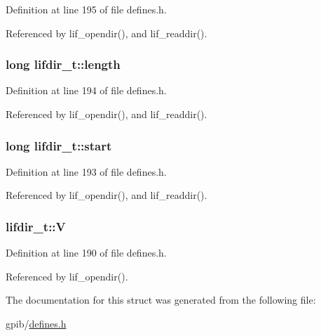 Definition at line 195 of file defines.\+h.



Referenced by lif\+\_\+opendir(), and lif\+\_\+readdir().

\subsubsection[{\texorpdfstring{length}{length}}]{\setlength{\rightskip}{0pt plus 5cm}long lifdir\+\_\+t\+::length}\hypertarget{structlifdir__t_a6645831320dcb5d1383a8796ae49a3e8}{}\label{structlifdir__t_a6645831320dcb5d1383a8796ae49a3e8}


Definition at line 194 of file defines.\+h.



Referenced by lif\+\_\+opendir(), and lif\+\_\+readdir().

\subsubsection[{\texorpdfstring{start}{start}}]{\setlength{\rightskip}{0pt plus 5cm}long lifdir\+\_\+t\+::start}\hypertarget{structlifdir__t_a4f82d919dbc56557a5dcb3e3d9e016c6}{}\label{structlifdir__t_a4f82d919dbc56557a5dcb3e3d9e016c6}


Definition at line 193 of file defines.\+h.



Referenced by lif\+\_\+opendir(), and lif\+\_\+readdir().

\subsubsection[{\texorpdfstring{V}{V}}]{ lifdir\+\_\+t\+::V}\hypertarget{structlifdir__t_a5a888dc3f1844ff0c8203d5bb0aa48b4}{}\label{structlifdir__t_a5a888dc3f1844ff0c8203d5bb0aa48b4}


Definition at line 190 of file defines.\+h.



Referenced by lif\+\_\+opendir().



The documentation for this struct was generated from the following file\+:\begin{DoxyCompactItemize}
\item 
gpib/\hyperlink{defines_8h}{defines.\+h}\end{DoxyCompactItemize}
